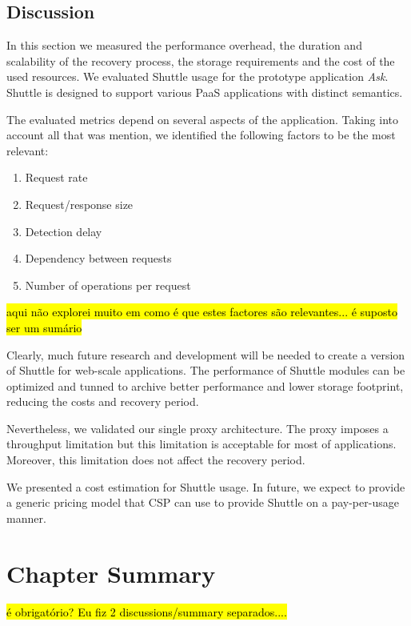\subsection{Discussion}\label{sec:eval:performance:discussion}
In this section we measured the performance overhead, the duration and scalability of the recovery process, the storage requirements and the cost of the used resources. We evaluated Shuttle usage for the prototype application \emph{Ask}. Shuttle is designed to support various \ac{PaaS} applications with distinct semantics.

The evaluated metrics depend on several aspects of the application. Taking into account all that was mention, we identified the following factors to be the most relevant:

\begin{enumerate}
  \item Request rate
  \item Request/response size
  \item Detection delay
  \item Dependency between requests   
  \item Number of operations per request
\end{enumerate}                              

\hl{aqui não explorei muito em como é que estes factores são relevantes... é suposto ser um sumário}

Clearly, much future research and development will be needed to create a version of Shuttle for web-scale applications. The performance of Shuttle modules can be optimized and tunned to archive better performance and lower storage footprint, reducing the costs and recovery period.

Nevertheless, we validated our single proxy architecture. The proxy imposes a throughput limitation but this limitation is acceptable for most of applications. Moreover, this limitation does not affect the recovery period.

We presented a cost estimation for Shuttle usage. In future, we expect to provide a generic pricing model that \acf{CSP} can use to provide Shuttle on a pay-per-usage manner.


\section{Chapter Summary}\label{sec:eval:performance:summary}
\hl{é obrigatório? Eu fiz 2 discussions/summary separados....}



